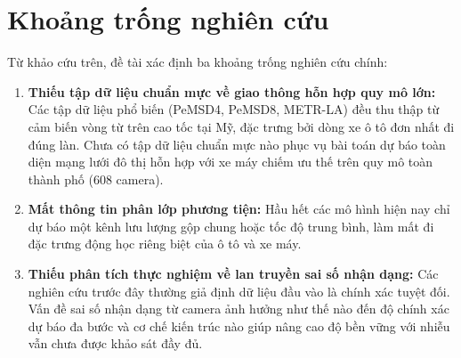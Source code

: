\section{Khoảng trống nghiên cứu}
Từ khảo cứu trên, đề tài xác định ba khoảng trống nghiên cứu chính:
\begin{enumerate}
    \item \textbf{Thiếu tập dữ liệu chuẩn mực về giao thông hỗn hợp quy mô lớn:} Các tập dữ liệu phổ biến (PeMSD4, PeMSD8, METR-LA) đều thu thập từ cảm biến vòng từ trên cao tốc tại Mỹ, đặc trưng bởi dòng xe ô tô đơn nhất đi đúng làn. Chưa có tập dữ liệu chuẩn mực nào phục vụ bài toán dự báo toàn diện mạng lưới đô thị hỗn hợp với xe máy chiếm ưu thế trên quy mô toàn thành phố (608 camera).
    \item \textbf{Mất thông tin phân lớp phương tiện:} Hầu hết các mô hình hiện nay chỉ dự báo một kênh lưu lượng gộp chung hoặc tốc độ trung bình, làm mất đi đặc trưng động học riêng biệt của ô tô và xe máy.
    \item \textbf{Thiếu phân tích thực nghiệm về lan truyền sai số nhận dạng:} Các nghiên cứu trước đây thường giả định dữ liệu đầu vào là chính xác tuyệt đối. Vấn đề sai số nhận dạng từ camera ảnh hưởng như thế nào đến độ chính xác dự báo đa bước và cơ chế kiến trúc nào giúp nâng cao độ bền vững với nhiễu vẫn chưa được khảo sát đầy đủ.
\end{enumerate}
